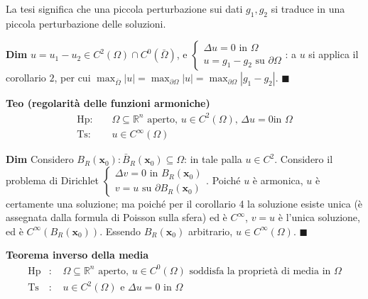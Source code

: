 \documentclass{article}
\begin{document}
La tesi significa che una piccola perturbazione sui dati $g_{1},g_{2}$ si
traduce in una piccola perturbazione delle soluzioni.

\textbf{Dim} $u=u_{1}-u_{2}\in C^{2}\left( \Omega \right) \cap C^{0}\left( 
\bar{\Omega}\right) $, e $\left\{ 
\begin{array}{c}
\Delta u=0\text{ in }\Omega \\ 
u=g_{1}-g_{2}\text{ su }\partial \Omega%
\end{array}%
\right. $: a $u$ si applica il corollario $2$, per cui $\max_{\bar{\Omega}%
}\left\vert u\right\vert =\max_{\partial \Omega }\left\vert u\right\vert
=\max_{\partial \Omega }\left\vert g_{1}-g_{2}\right\vert $. $\blacksquare $

\textbf{Teo (regolarit\`{a} delle funzioni armoniche)}%
\begin{eqnarray*}
\text{Hp}\text{: } &&\Omega \subseteq 
\mathbb{R}
^{n}\text{ aperto, }u\in C^{2}\left( \Omega \right) \text{, }\Delta u=0\text{
in }\Omega \\
\text{Ts}\text{: } &&u\in C^{\infty }\left( \Omega \right)
\end{eqnarray*}

\textbf{Dim} Considero $B_{R}\left( \mathbf{x}_{0}\right) :\bar{B}_{R}\left( 
\mathbf{x}_{0}\right) \subseteq \Omega $: in tale palla $u\in C^{2}$.
Considero il problema di Dirichlet $\left\{ 
\begin{array}{c}
\Delta v=0\text{ in }B_{R}\left( \mathbf{x}_{0}\right) \\ 
v=u\text{ su }\partial B_{R}\left( \mathbf{x}_{0}\right)%
\end{array}%
\right. $. Poich\'{e} $u$ \`{e} armonica, $u$ \`{e} certamente una
soluzione; ma poich\'{e} per il corollario 4 la soluzione esiste unica (\`{e}
assegnata dalla formula di Poisson sulla sfera) ed \`{e} $C^{\infty }$, $v=u$
\`{e} l'unica soluzione, ed \`{e} $C^{\infty }\left( B_{R}\left( \mathbf{x}%
_{0}\right) \right) $. Essendo $B_{R}\left( \mathbf{x}_{0}\right) $
arbitrario, $u\in C^{\infty }\left( \Omega \right) $. $\blacksquare $

\textbf{Teorema inverso della media}%
\begin{eqnarray*}
\text{Hp} &\text{: }&\Omega \subseteq 
\mathbb{R}
^{n}\text{ aperto, }u\in C^{0}\left( \Omega \right) \text{ soddisfa la
propriet\`{a} di media in }\Omega \\
\text{Ts} &\text{: }&u\in C^{2}\left( \Omega \right) \text{ e }\Delta u=0%
\text{ in }\Omega
\end{eqnarray*}
\end{document}
